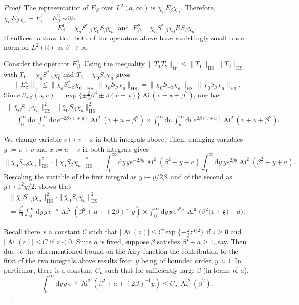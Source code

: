 \documentclass[AHL,Unicode,longabstracts]{cedram}
\newcommand*{\dd}{\mathrm{d}}
\newcommand*{\dy}{\dd y}
\newcommand*{\du}{\dd u}
\newcommand*{\dv}{\dd v}
\DeclareMathOperator{\tr}{tr}
\DeclareMathOperator{\hs}{HS}
\DeclareMathOperator{\Ai}{Ai}
\newcommand{\R}{\mathbb{R}}
\begin{document}
\begin{proof}
The representation of $E_{\beta}$ over $L^2(a,\infty)$ is $\chi_a E_{\beta} \chi_a$. Therefore, $\chi_a E_{\beta} \chi_a= E^1_{\beta} - E^2_{\beta}$ with
\[
E^1_{\beta} = \chi_a S_{-\beta}^{*} \bar{\chi}_0 S_{\beta} \chi_a\;\; \text{and}\;\;
E^2_{\beta} = \chi_a S_{-\beta}^{*} \bar{\chi}_0 R S_{\beta} \chi_a.
\]
If suffices to show that both of the operators above have vanishingly small trace norm on $L^2(\R)$ as $\beta \to \infty$.

Consider the operator $E^1_{\beta}$. Using the inequality $\| T_1 T_2 \|_{\tr} \leq \|T_1\|_{\hs} \,\|T_2\|_{\hs}$ with $T_1 = \chi_a S_{-\beta}^{*} \bar{\chi}_0$ and $T_2 = \bar{\chi}_0 S_{\beta} \chi_a$ gives
\[
\|E^1_{\beta}\|_{\tr} \leq \| \chi_a S_{-\beta}^{*} \bar{\chi}_0 \|_{\hs}\, \| \bar{\chi}_0 S_{\beta} \chi_a \|_{\hs}
= \| \bar{\chi}_0 S_{-\beta} \chi_a \|_{\hs}\, \| \bar{\chi}_0 S_{\beta} \chi_a \|_{\hs}.
\]
Since $S_{\pm \beta}(u,v) = \exp \{\pm \frac{2}{3}\beta^3 \pm \beta(v-u)\} \Ai(v-u+\beta^2)$, one has
\begin{multline*}
\| \bar{\chi}_0 S_{-\beta} \chi_a\|^2_{\hs} \cdot \| \bar{\chi}_0 S_{\beta} \chi_a \|^2_{\hs} \\
=\int_0^{\infty} \du \, \int_a^{\infty} \dv \, e^{-2 \beta(v+u)} \Ai^2(v+u+\beta^2) \times 
\int_0^{\infty} \du \, \int_a^{\infty} \dv \, e^{2 \beta(v+u)} \Ai^2(v+u+\beta^2).
\end{multline*}

We change variable $v \mapsto v+a$ in both integrals above. Then, changing variables $y := u+v$ and $x := u-v$ in both integrals gives
\[
\| \bar{\chi}_0 S_{-\beta} \chi_a\|^2_{\hs} \cdot \| \bar{\chi}_0 S_{\beta} \chi_a \|^2_{\hs}=
\int_0^{\infty} \!\dy \, y e^{-2\beta y} \Ai^2(\beta^2 + y +a) \int_0^{\infty} \!\dy \, y e^{2\beta y} \Ai^2(\beta^2+y+a).
\]
Rescaling the variable of the first integral as $y \mapsto y/2\beta$, and of the second as $y \mapsto \beta^2 y/2$, shows that
\begin{multline}\label{eqn:error1b}
\| \bar{\chi}_0 S_{-\beta} \chi_a\|^2_{\hs} \cdot \| \bar{\chi}_0 S_{\beta} \chi_a \|^2_{\hs} \\
=\frac{\beta^2}{16} \int_0^{\infty}\dy\, y\, e^{-y}\, \Ai^2(\beta^2 + a + (2\beta)^{-1}y) \times  \int_0^{\infty}\dy\, y\, e^{\beta^3 y} \, \Ai^2 \Big (\beta^2 \Big(1+\frac{y}{2}\Big)+ a \Big).
\end{multline}

Recall there is a constant $C$ such that $|\Ai(z)| \leq C \exp \{ -\frac{2}{3}z^{3/2} \}$ if $z \geq 0$ and $|\Ai(z)| \leq C$ if $z < 0$. Since $a$ is fixed, suppose $\beta$ satisfies $\beta^2 + a \geq 1$, say. Then due to the aforementioned bound on the Airy function the contribution to the first of the two integrals above results from $y$ being of bounded order, $y \approx 1$. In particular, there is a constant $C_a$ such that for sufficiently large $\beta$ (in terms of $a$),
\[
\int_0^{\infty}\dy\, y\, e^{-y}\, \Ai^2(\beta^2 + a + (2\beta)^{-1}y) \leq C_a \, \Ai^2(\beta^2).
\]


\end{proof}
\end{document}
